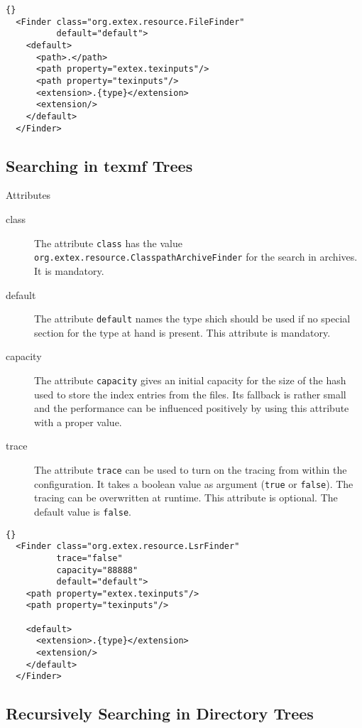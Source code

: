 \begin{lstlisting}{}
  <Finder class="org.extex.resource.FileFinder"
          default="default">
    <default>
      <path>.</path>
      <path property="extex.texinputs"/>
      <path property="texinputs"/>
      <extension>.{type}</extension>
      <extension/>
    </default>
  </Finder>
\end{lstlisting}


\INCOMPLETE

\subsection{Searching in texmf Trees}

Attributes
\begin{description}
\item[class] The attribute \texttt{class} has the value
  \texttt{org.extex.resource.ClasspathArchiveFinder} for the search in
  archives. It is mandatory.
\item[default] The attribute \texttt{default} names the type shich
  should be used if no special section for the type at hand is
  present. This attribute is mandatory.
\item[capacity] The attribute \texttt{capacity} gives an initial
  capacity for the size of the hash used to store the index entries
  from the  files. Its fallback is rather small and the
  performance can be influenced positively by using this attribute
  with a proper value.
\item[trace] The attribute \texttt{trace} can be used to turn on the
  tracing from within the configuration. It takes a boolean value as
  argument (\texttt{true} or \texttt{false}). The tracing can be
  overwritten at runtime. This attribute is optional. The default
  value is \texttt{false}.
\end{description}

\begin{lstlisting}{}
  <Finder class="org.extex.resource.LsrFinder"
          trace="false"
          capacity="88888"
          default="default">
    <path property="extex.texinputs"/>
    <path property="texinputs"/>

    <default>
      <extension>.{type}</extension>
      <extension/>
    </default>
  </Finder>
\end{lstlisting}

\INCOMPLETE

\subsection{Recursively Searching in Directory Trees}

